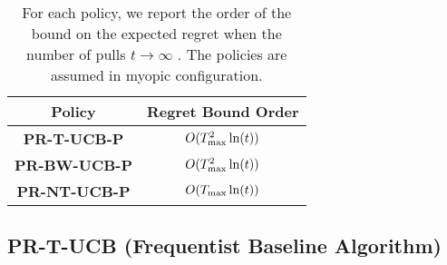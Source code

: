 \begin{table}[H]
	\caption{For each policy, we report the order of the bound on the expected regret when the number of pulls $t \rightarrow \infty$ . The policies are assumed in myopic configuration.}
	\centering
	\begin{tabular}{|c|c|}
		\hline
		\textbf{Policy}      & \textbf{Regret Bound Order} \\ \hline
		\textbf{PR-T-UCB-P}  & $O(T_{\textnormal{max}}^2\ln(t))$          \\
		\textbf{PR-BW-UCB-P} & $O(T_{\textnormal{max}}^2\ln(t))$          \\
		\textbf{PR-NT-UCB-P} & $O(T_{\textnormal{max}}\ln(t))$            \\ \hline
	\end{tabular}
	\label{t:garanzie}
\end{table}





\subsection{PR-T-UCB (Frequentist Baseline Algorithm)}

